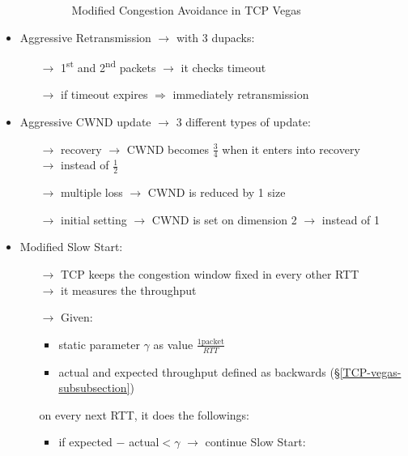 \begin{itemize}
\begin{itemize}
\begin{figure}[!h]
            \caption{Modified Congestion Avoidance in TCP Vegas}
            \label{congestion-avoidance-vegas}
        \end{figure}
    \end{itemize}
    \item Aggressive Retransmission $\rightarrow$ with 3 dupacks:
    \begin{itemize}
        \item[$\rightarrow$] 1\textsuperscript{st} and 2\textsuperscript{nd} packets $\rightarrow$ it checks timeout
        \item[$\rightarrow$] if timeout expires $\Rightarrow$ immediately retransmission
    \end{itemize}
    \item Aggressive CWND update $\rightarrow$ 3 different types of update:
    \begin{itemize}
        \item[$\rightarrow$] recovery $\rightarrow$ CWND becomes $\frac{3}{4}$ when it enters into recovery\\
        $\rightarrow$ instead of $\frac{1}{2}$
        \item[$\rightarrow$] multiple loss $\rightarrow$ CWND is reduced by 1 size
        \item[$\rightarrow$] initial setting $\rightarrow$ CWND is set on dimension 2 $\rightarrow$ instead of 1 
    \end{itemize}
    \item Modified Slow Start:
    \begin{itemize}
        \item[$\rightarrow$] TCP keeps the congestion window fixed in every
        other RTT\\$\rightarrow$ it measures the throughput
        \item[$\rightarrow$] Given:
        \begin{itemize}
            \item static parameter $\gamma$ as value $\frac{1 \text{packet}}{RTT}$
            \item actual and expected throughput defined as backwards (§\ref{TCP-vegas-subsubsection})
        \end{itemize}
        on every next RTT, it does the followings:
        \begin{itemize}
            \item if expected $-$ actual$< \gamma$ $\rightarrow$ continue Slow Start:
            \begin{itemize}

\end{itemize}
\end{itemize}
\end{itemize}
\end{itemize}
